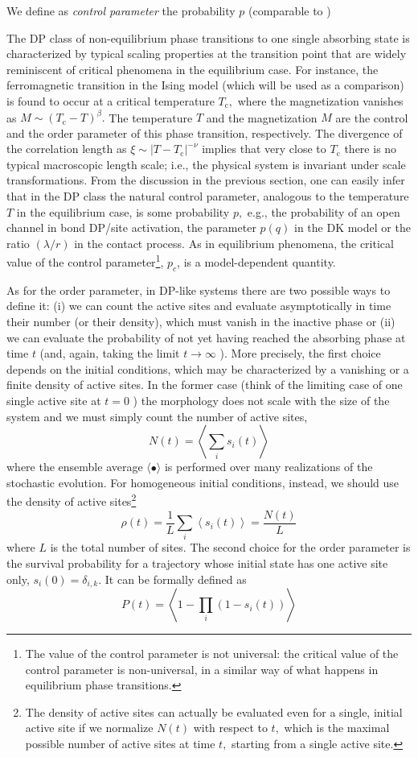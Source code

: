 \documentclass[\main/main.tex]{subfiles}
\begin{document}
We define as \textit{control parameter} the probability $p$ (comparable to )

The DP class of non-equilibrium phase transitions to one single absorbing state is characterized by typical scaling properties at the transition point that are widely reminiscent of critical phenomena in the equilibrium case. For instance, the ferromagnetic transition in the Ising model (which will be used as a comparison) is found to occur at a critical temperature $T_{\mathrm{c}},$ where the magnetization vanishes as $M \sim\left(T_{\mathrm{c}}-T\right)^{\beta} .$ The temperature $T$ and the magnetization $M$ are the control and the order parameter of this phase transition, respectively. The divergence of the correlation length as $\xi \sim\left|T-T_{\mathrm{c}}\right|^{-\nu}$ implies that very close to $T_{\mathrm{c}}$ there is no typical macroscopic length scale; i.e., the physical system is invariant under scale transformations. From the discussion in the previous section, one can easily infer that in the DP class the natural control parameter, analogous to the temperature $T$ in the equilibrium case, is some probability $p,$ e.g., the probability of an open channel in bond DP/site activation, the parameter $p(q)$ in the DK model or the ratio $(\lambda / r)$ in the contact process. As in equilibrium phenomena, the critical value of the control parameter\footnote{The value of the control parameter is not universal: the critical value of the control parameter is non-universal, in a similar way of what happens in equilibrium phase transitions.}, $p_{c}$, is a model-dependent quantity.

As for the order parameter, in DP-like systems there are two possible ways to define it: (i) we can count the active sites and evaluate asymptotically in time their number (or their density), which must vanish in the inactive phase or (ii) we can evaluate the probability of not yet having reached the absorbing phase at time $t$ (and, again, taking the limit $t \rightarrow \infty$ ). More precisely, the first choice depends on the initial conditions, which may be characterized by a vanishing or a finite density of active sites. In the former case (think of the limiting case of one single active site at $t=0$ ) the morphology does not scale with the size of the system and we must simply count the number of active sites,
$$
N(t)=\left\langle\sum_{i} s_{i}(t)\right\rangle
$$
where the ensemble average $\langle\bullet\rangle$ is performed over many realizations of the stochastic evolution. For homogeneous initial conditions, instead, we should use the density of active sites\footnote{The density of active sites can actually be evaluated even for a single, initial active site if we normalize $N(t)$ with respect to $t,$ which is the maximal possible number of active sites at time $t,$ starting from a single active site.}
$$
\rho(t)=\frac{1}{L} \sum_{i}\left\langle s_{i}(t)\right\rangle=\frac{N(t)}{L}
$$
where $L$ is the total number of sites. The second choice for the order parameter is the survival probability for a trajectory whose initial state has one active site only, $s_{i}(0)=\delta_{i, k}$. It can be formally defined as
$$
P(t)=\left\langle 1-\prod_{i}\left(1-s_{i}(t)\right)\right\rangle
$$
\end{document}
